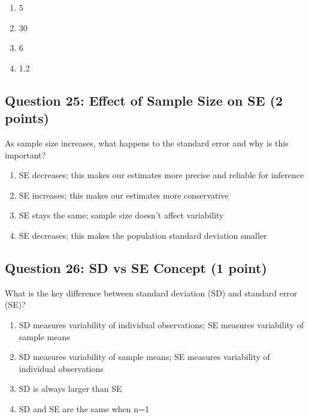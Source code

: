 \documentclass[11pt]{article}
\begin{document}
\begin{enumerate}[label=\Alph*)]
\item 5
\item 30
\item 6
\item 1.2
\end{enumerate}

\vspace{0.5cm}

\subsection*{Question 25: Effect of Sample Size on SE (2 points)}

As sample size increases, what happens to the standard error and why is this important?

\begin{enumerate}[label=\Alph*)]
\item SE decreases; this makes our estimates more precise and reliable for inference
\item SE increases; this makes our estimates more conservative
\item SE stays the same; sample size doesn't affect variability
\item SE decreases; this makes the population standard deviation smaller
\end{enumerate}

\vspace{0.5cm}

\subsection*{Question 26: SD vs SE Concept (1 point)}

What is the key difference between standard deviation (SD) and standard error (SE)?

\begin{enumerate}[label=\Alph*)]
\item SD measures variability of individual observations; SE measures variability of sample means
\item SD measures variability of sample means; SE measures variability of individual observations
\item SD is always larger than SE
\item SD and SE are the same when n=1
\end{enumerate}

\vspace{0.5cm}
\end{document}
